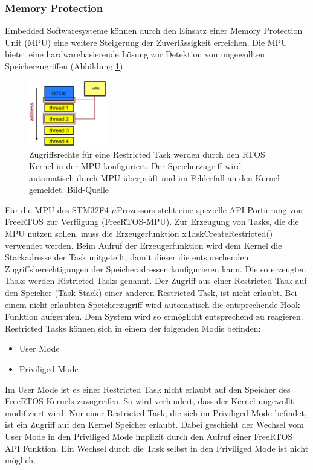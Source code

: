 \subsubsection{Memory Protection}
\label{sec:Memory Protection}
Embedded Softwaresysteme können durch den Einsatz einer Memory Protection Unit (MPU) eine weitere Steigerung der Zuverlässigkeit erreichen. Die MPU bietet eine hardwarebasierende Lösung zur Detektion von ungewollten Speicherzugriffen (Abbildung \ref{fig:AddressSpaceMMU}). 
\begin{figure}[htb]
	\centering
		\includegraphics[width=0.3\textwidth]{Pictures/EmbeddedCom/addressSpaceMMU}
	\caption{Zugriffsrechte für eine Restricted Task werden durch den RTOS Kernel in der MPU konfiguriert. Der Speicherzugriff wird automatisch durch MPU überprüft und im Fehlerfall an den Kernel gemeldet. Bild-Quelle~\protect{}}
	\label{fig:AddressSpaceMMU}
\end{figure} 
Für die MPU des STM32F4 $\mu$\-Pro\-zesso\-rs steht eine spezielle API Portierung von FreeRTOS zur Verfügung (FreeRTOS-MPU). Zur Erzeugung von Tasks, die die MPU nutzen sollen, muss die Erzeugerfunktion xTaskCreateRestricted() verwendet werden. Beim Aufruf der Erzeugerfunktion wird dem Kernel die Stackadresse der Task mitgeteilt, damit dieser die entsprechenden Zugriffsberechtigungen der Speicheradressen konfigurieren kann. Die so erzeugten Tasks werden Ristricted Tasks genannt. Der Zugriff aus einer Restricted Task auf den Speicher (Task-Stack) einer anderen Restricted Task, ist nicht erlaubt. Bei einem nicht erlaubten Speicherzugriff wird automatisch die entsprechende Hook-Funktion aufgerufen. Dem System wird so ermöglicht entsprechend zu reagieren. Restricted Tasks kön\-nen sich in einem der folgenden Modis befinden:
\begin{itemize}
	\item User Mode
	\item Priviliged Mode 
\end{itemize}
Im User Mode ist es einer Restricted Task nicht erlaubt auf den Speicher des FreeRTOS Kernels zuzugreifen. So wird verhindert, dass der Kernel ungewollt modifiziert wird. Nur einer Restricted Task, die sich im Priviliged Mode befindet, ist ein Zugriff auf den Kernel Speicher erlaubt. Dabei geschieht der Wechsel vom User Mode in den Priviliged Mode implizit durch den Aufruf einer FreeRTOS API Funktion. Ein Wechsel durch die Task selbst in den Priviliged Mode ist nicht möglich.
